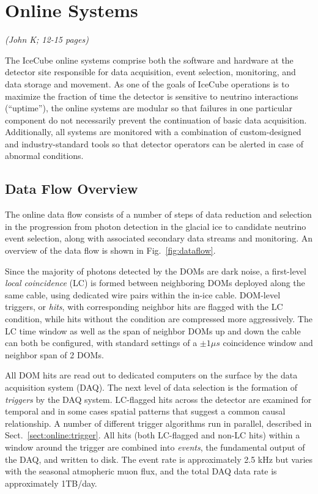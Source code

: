 
\section{\label{sect:online}Online Systems}
\textsl{(John K; 12-15 pages)}

The IceCube online systems comprise both the software and hardware
at the detector site responsible for data acquisition, event selection,
monitoring, and data storage and movement.  As one of the goals of IceCube
operations is to maximize the fraction of time the detector is sensitive
to neutrino interactions (``uptime''), the online systems are modular so
that failures in one
particular component do not necessarily prevent the continuation of basic
data acquisition. Additionally, all systems are monitored with a combination of
custom-designed and industry-standard tools so that detector operators can
be alerted in case of abnormal conditions.

\subsection{\label{sect:online:dataflow}Data Flow Overview}

The online data flow consists of a number of steps of data reduction and
selection in the progression from photon detection in the glacial ice to
candidate neutrino event selection, along with associated secondary data
streams and monitoring.  An overview of the data flow is shown in
Fig.~\ref{fig:dataflow}.

Since the majority of photons detected by the DOMs are dark noise, a
first-level \emph{local coincidence} (LC) is formed between neighboring
DOMs deployed along the same cable, using dedicated wire pairs within the
in-ice cable.  DOM-level triggers, or \emph{hits}, with corresponding
neighbor hits are flagged with the LC condition, while hits without the
condition are compressed more aggressively.  The LC time window as well as
the span of neighbor DOMs up and down the cable can both be configured,
with standard settings of a $\pm1 \mu s$ coincidence window and neighbor
span of 2 DOMs.

All DOM hits are read out to dedicated computers on the surface by the data
acquisition system (DAQ).  The next level of data selection is the
formation of \emph{triggers} by the DAQ system.  LC-flagged hits across the
detector are examined for temporal and in some cases spatial patterns that
suggest a common causal relationship.  A number of different trigger
algorithms run in parallel, described in Sect.~\ref{sect:online:trigger}.  All hits
(both LC-flagged and non-LC hits) within a window around the trigger are
combined into \emph{events}, the fundamental output of the DAQ, and written
to disk.  The event rate is approximately 2.5 kHz but varies with the
seasonal atmopheric muon flux, and the total DAQ data rate is approximately
1TB/day.

